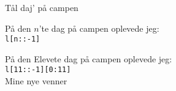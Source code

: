 \begin{song}{Tål daj' på campen}
  \renewcommand{\theSBVerseCnt}{$n<11$}

  \begin{SBVerse}
    På den $n$'te dag på campen oplevede jeg:\\
    \texttt{l[n::-1]}
  \end{SBVerse}

  \renewcommand{\theSBVerseCnt}{$11$}

  \begin{SBVerse}
    På den Elevete dag på campen oplevede jeg:\\
    \texttt{l[11::-1][0:11]}\\
    Mine nye venner
  \end{SBVerse}

\end{song}